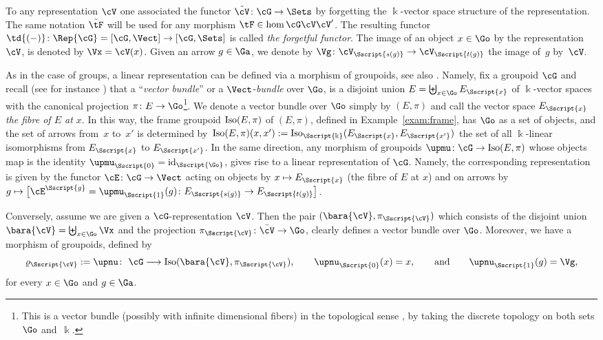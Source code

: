 To any representation $\cV$ one associated the functor $\tilde{\cV}\colon \cG \to \Sets$ by forgetting the $\Bbbk$-vector space structure of the representation. The same notation $\tilde{\tF}$ will be used for any morphism $\tF \in \hom{\cG}{\cV}{\cV'}$. The resulting functor $\td{(-)}\colon \Rep{\cG}=[\cG, \Vect] \to [\cG, \Sets]$ is called \emph{the forgetful functor}. The image of an object $x \in \Go$ by the representation $\cV$, is denoted by $\Vx=\cV(x)$. Given an arrow $g \in \Ga$, we denote by $\Vg\colon \cV_{\Sscript{s(g)}} \to \cV_{\Sscript{t(g)}}$ the image of~$g$ by~$\cV$.

\begin{Remark}\label{rem:FrameGrpd}As in the case of groups, a linear representation can be defined via a morphism of groupoids, see also \cite[Definition~1.11]{Renault:1980}. Namely, fix a groupoid $\cG$ and recall (see for instance \cite[p.~98]{Sternberg:1994}) that a ``\emph{vector bundle}'' or a $\Vect$-\emph{bundle} over $\Go$, is a disjoint union $E=\biguplus_{ x \in \Go}E_{\Sscript{x}}$ of $\Bbbk$-vector spaces with the canonical projection $\pi\colon E \to \Go$\footnote{This is a vector bundle (possibly with infinite dimensional fibers) in the topological sense \cite[Definition~2.1]{Karoubi:1978}, by taking the discrete topology on both sets $\Go$ and~$\Bbbk$.}. We denote a vector bundle over $\Go$ simply by $(E,\pi)$ and call the vector space $E_{\Sscript{x}}$ \emph{the fibre of $E$ at $x$}. In this way, the frame groupoid ${\rm Iso}(E,\pi)$ of $(E,\pi)$, defined in Example~\ref{exam:frame}, has $\Go$ as a set of objects, and the set of arrows from~$x$ to~$x'$ is determined by~${\rm Iso}(E,\pi)(x,x'):={\rm Iso}_{\Sscript{\Bbbk}}( E_{\Sscript{x}}, E_{\Sscript{x'}})$ the set of all $\Bbbk$-linear isomorphisms from $E_{\Sscript{x}}$ to $E_{\Sscript{x'}}$. In the same direction, any morphism of groupoids $\upmu\colon \cG \to {\rm Iso}(E,\pi)$ whose objects map is the identity $\upmu_{\Sscript{0}}={\rm id}_{\Sscript{\Go}}$, gives rise to a linear representation of $\cG$. Namely, the corresponding representation is given by the functor $\cE\colon \cG \to \Vect$ acting on objects by $x \mapsto E_{\Sscript{x}}$ (the fibre of $E$ at $x$) and on arrows by $g \mapsto \big[\cE^{\Sscript{g}}=\upmu_{\Sscript{1}}(g)\colon E_{\Sscript{s(g)}} \to E_{\Sscript{t(g)}}\big]$.

Conversely, assume we are given a $\cG$-representation $\cV$. Then the pair $(\bara{\cV}, \pi_{\Sscript{\cV}})$ which consists of the disjoint union $\bara{\cV}=\biguplus_{x \in \Go}\Vx$ and the projection $\pi_{\Sscript{\cV}}\colon \bar{\cV} \to \Go$, clearly defines a vector bundle over $\Go$. Moreover, we have a morphism of groupoids, defined by
\begin{gather}\label{Eq:rhoV}
\varrho_{\Sscript{\cV}}:=\upnu\colon \ \cG \longrightarrow {\rm Iso}(\bara{\cV}, \pi_{\Sscript{\cV}}), \qquad \upnu_{\Sscript{0}}(x)=x, \qquad \text{and} \qquad \upnu_{\Sscript{1}}(g)=\Vg,
\end{gather}
for every $x \in \Go$ and $g \in \Ga$.


\end{Remark}
